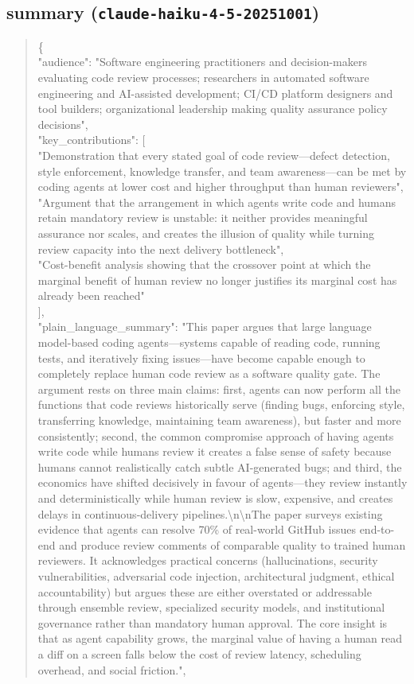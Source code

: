 \documentclass[11pt]{article}
\begin{document}
\subsection*{summary (\texttt{claude-haiku-4-5-20251001})}
\begin{quote}\small\ttfamily\raggedright
\{\\
  "audience": "Software engineering practitioners and decision-makers evaluating code review processes; researchers in automated software engineering and AI-assisted development; CI/CD platform designers and tool builders; organizational leadership making quality assurance policy decisions",\\
  "key\_contributions": [\\
    "Demonstration that every stated goal of code review---defect detection, style enforcement, knowledge transfer, and team awareness---can be met by coding agents at lower cost and higher throughput than human reviewers",\\
    "Argument that the arrangement in which agents write code and humans retain mandatory review is unstable: it neither provides meaningful assurance nor scales, and creates the illusion of quality while turning review capacity into the next delivery bottleneck",\\
    "Cost-benefit analysis showing that the crossover point at which the marginal benefit of human review no longer justifies its marginal cost has already been reached"\\
  ],\\
  "plain\_language\_summary": "This paper argues that large language model-based coding agents---systems capable of reading code, running tests, and iteratively fixing issues---have become capable enough to completely replace human code review as a software quality gate. The argument rests on three main claims: first, agents can now perform all the functions that code reviews historically serve (finding bugs, enforcing style, transferring knowledge, maintaining team awareness), but faster and more consistently; second, the common compromise approach of having agents write code while humans review it creates a false sense of safety because humans cannot realistically catch subtle AI-generated bugs; and third, the economics have shifted decisively in favour of agents---they review instantly and deterministically while human review is slow, expensive, and creates delays in continuous-delivery pipelines.\textbackslash{}n\textbackslash{}nThe paper surveys existing evidence that agents can resolve 70\% of real-world GitHub issues end-to-end and produce review comments of comparable quality to trained human reviewers. It acknowledges practical concerns (hallucinations, security vulnerabilities, adversarial code injection, architectural judgment, ethical accountability) but argues these are either overstated or addressable through ensemble review, specialized security models, and institutional governance rather than mandatory human approval. The core insight is that as agent capability grows, the marginal value of having a human read a diff on a screen falls below the cost of review latency, scheduling overhead, and social friction.",\\

\end{quote}
\end{document}
